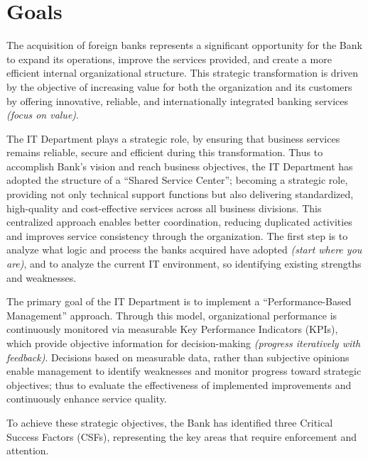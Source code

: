 \chapter{Goals}
\label{cap:goals}



The acquisition of foreign banks represents a significant opportunity for the Bank to expand its operations, improve the services provided, and create a more efficient internal organizational structure. This strategic transformation is driven by the objective of increasing value for both the organization and its customers by offering innovative, reliable, and internationally integrated banking services \textit{(focus on value)}.

The IT Department plays a strategic role, by ensuring that business services remains reliable, secure and efficient during this transformation. Thus to accomplish Bank's vision and reach business objectives, the IT Department has adopted the structure of a ``Shared Service Center''; becoming a strategic role, providing not only technical support functions but also delivering standardized, high-quality and cost-effective services across all business divisions.
This centralized approach enables better coordination, reducing duplicated activities and improves service consistency through the organization. The first step is to analyze what logic and process the banks acquired have adopted \textit{(start where you are)}, and to analyze the current IT environment, so identifying existing strengths and weaknesses.


The primary goal of the IT Department is to implement a ``Performance-Based Management'' approach. Through this model, organizational performance is continuously monitored via measurable Key Performance Indicators (KPIs), which provide objective information for decision-making \textit{(progress iteratively with feedback)}. Decisions based on measurable data, rather than subjective opinions enable management to identify weaknesses and monitor progress toward strategic objectives; thus to evaluate the effectiveness of implemented improvements and continuously enhance service quality.

To achieve these strategic objectives, the Bank has identified three Critical Success Factors (CSFs), representing the key areas that require enforcement and attention.

